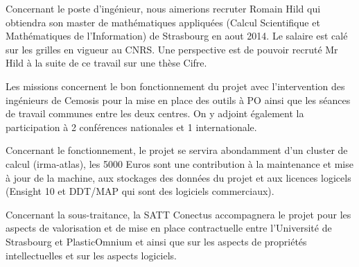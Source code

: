 \documentclass[12pt]{article} \usepackage{fontspec}
\begin{document}
Concernant le poste d'ingénieur, nous aimerions recruter Romain Hild qui
obtiendra son master de mathématiques appliquées (Calcul Scientifique et
Mathématiques de l'Information) de Strasbourg en aout 2014. Le salaire est calé
sur les grilles en vigueur au CNRS. Une perspective est de pouvoir recruté Mr
Hild à la suite de ce travail sur une thèse Cifre.

Les missions concernent le bon fonctionnement du projet avec l'intervention des
ingénieurs de Cemosis pour la mise en place des outils à PO ainsi que les
séances de travail communes entre les deux centres. On y adjoint également la
participation à 2 conférences nationales et 1 internationale.

Concernant le fonctionnement, le projet se servira abondamment d'un cluster de
calcul (irma-atlas), les 5000 Euros sont une contribution à la maintenance et
mise à jour de la machine, aux stockages des données du projet et aux licences
logicels (Ensight 10 et DDT/MAP qui sont des logiciels commerciaux).

Concernant la sous-traitance, la SATT Conectus accompagnera le projet pour les
aspects de valorisation et de mise en place contractuelle entre l'Université de
Strasbourg et PlasticOmnium et ainsi que sur les aspects de propriétés
intellectuelles et sur les aspects logiciels.



\end{document}

